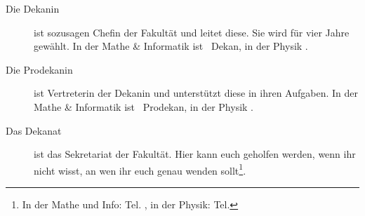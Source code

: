 \begin{description}

    \item[Die Dekanin] ist sozusagen Chefin der Fakultät und leitet diese. Sie wird für vier Jahre gewählt. In der Mathe \& Informatik ist \dekanmathelang\ Dekan, in der Physik \dekanphysiklang .

    \item[Die Prodekanin] ist Vertreterin der Dekanin und unterstützt diese in ihren Aufgaben. In der Mathe \& Informatik ist \prodekanmathe\ Prodekan, in der Physik \prodekanphysik .\\[2em]

    \item[Das Dekanat] ist das Sekretariat der Fakultät. Hier kann euch geholfen werden, wenn ihr nicht wisst, an wen ihr euch genau wenden sollt\footnote{In der Mathe und Info: Tel.  \dekanatmathetelefon , in der Physik: Tel. \dekanatphysiktelefon}.


\end{description}
